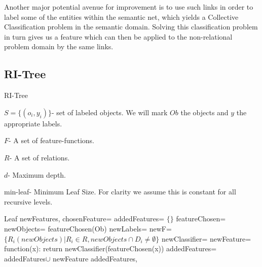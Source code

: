 \documentclass{article}
\theoremstyle{definition}
\begin{document}
Another major potential avenue for improvement is to use such links in order to label some of the entities within the semantic net, which yields a Collective Classification \citep{laorden2012collective, kajdanowicz2013collective} problem in the semantic domain. Solving this classification problem in turn gives us a feature which can then be applied to the non-relational problem domain by the same links.

\begin{appendices}
	\section{RI-Tree} \label{app:2}
	
	\begin{algorithm}[H]
		\caption{RI-Tree}
		\label{code2}
		\small
		$S=\{(o_{i},y_{i})\}$- set of labeled objects. We will mark $Ob$ the objects and $y$ the appropriate labels.
		
		$F$- A set of feature-functions.
		
		$R$- A set of relations.
		
		$d$- Maximum depth.
		
		min-leaf- Minimum Leaf Size. For clarity we assume this is constant for all recursive levels.
		
		\begin{algorithmic}
					\State
					\Return Leaf
				\EndIf
				\State newFeatures, chosenFeature= 
				\State {}
				\State
				\Return {}
			\EndFunction
				\State
				\Return {}
			\EndIf
			\State addedFeatures= $\{\}$
				\State
				\State featureChosen= 
				\State newObjects= featureChosen(Ob)
				\State newLabels= 
				\State newF= $\{R_{i}(newObjects)|R_{i}\in R, newObjects\cap D_{i}\neq\emptyset\}$
				\State newClassifier= 
				\State newFeature= function(x): return newClassifier(featureChosen(x))
					\State
					\State addedFeatures= addedFatures$\cup$ newFeature
				\EndIf
			\EndWhile
			\State
			\Return addedFeatures, 
			\EndFunction
			
		\end{algorithmic}
	\end{algorithm}
	
\end{appendices}

\clearpage


\end{document}
